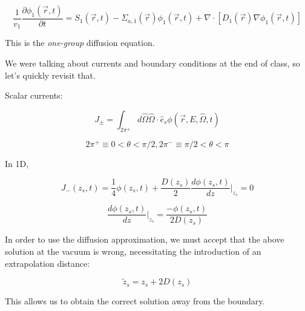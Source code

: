 \documentclass[12pt]{article}
\newcommand{\rvec}{\ensuremath{\vec{r}}}
\newcommand{\omvec}{\ensuremath{\hat{\Omega}}}
\begin{document}
\begin{equation*}
\frac{1}{v_1}\frac{\partial \phi_1(\rvec,t)}{\partial t} = S_1(\rvec,t) - 
\Sigma_{a,1}(\rvec)\phi_1(\rvec,t) + \nabla\cdot[D_1(\rvec)\nabla\phi_1(\rvec,t)]
\end{equation*}

This is the \emph{one-group} diffusion equation.


We were talking about currents and boundary conditions at the end of class, so let's quickly revisit that. 

Scalar currents:

\begin{equation*}
J_{\pm} = \int_{2\pi^{\pm}}d\omvec\omvec\cdot\hat{e}_s\phi(\rvec,E,\omvec,t)
\end{equation*}

\begin{equation*}
2\pi^+ \equiv 0 < \theta < \pi/2, 2\pi^- \equiv \pi/2 < \theta < \pi
\end{equation*}

In 1D,

\begin{equation*}
J_-(z_s,t) = \frac{1}{4}\phi(z_s,t) + \frac{D(z_s)}{2}\frac{d\phi(z_s,t)}{dz}\Bigr|_{z_s} = 0
\end{equation*}

\begin{equation*}
\frac{d\phi(z_s,t)}{dz}\Bigr|_{z_s} = \frac{-\phi(z_s,t)}{2D(z_s)}
\end{equation*}

In order to use the diffusion approximation, we must accept that the above solution at the vacuum is 
wrong, necessitating the introduction of an extrapolation distance:

\begin{equation*}
\tilde{z}_s = z_s + 2D(z_s)
\end{equation*}

This allows us to obtain the correct solution away from the boundary.
\end{document}
